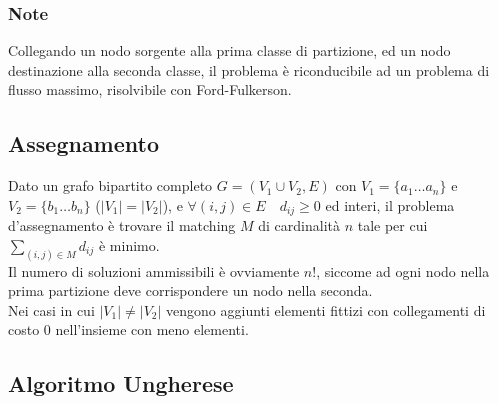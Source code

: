 \documentclass[../template]{subfiles}
\begin{document}
\subsubsection{Note}
Collegando un nodo sorgente alla prima classe di partizione, ed un nodo destinazione alla seconda classe, il problema è riconducibile ad un
problema di flusso massimo, risolvibile con Ford-Fulkerson.

\subsection{Assegnamento}
Dato un grafo bipartito completo $G = (V_1 \cup V_2, E)$ con $V_1 = \{a_1 \dots a_n\}$ e $V_2 = \{b_1 \dots b_n\}$ ($|V_1| = |V_2|$),
e $\forall (i, j) \in E \quad d_{ij} \ge 0$ ed interi,
il problema d'assegnamento è trovare il matching $M$ di cardinalità $n$ tale per cui
$\sum_{(i, j) \in M} d_{ij}$ è minimo.
\\[10pt]
Il numero di soluzioni ammissibili è ovviamente $n!$, siccome ad ogni nodo nella prima
partizione deve corrispondere un nodo nella seconda.
\\
Nei casi in cui $|V_1| \neq |V_2|$ vengono aggiunti elementi fittizi con collegamenti di costo 0 nell'insieme con meno elementi.

\subsection{Algoritmo Ungherese}

\end{document}
